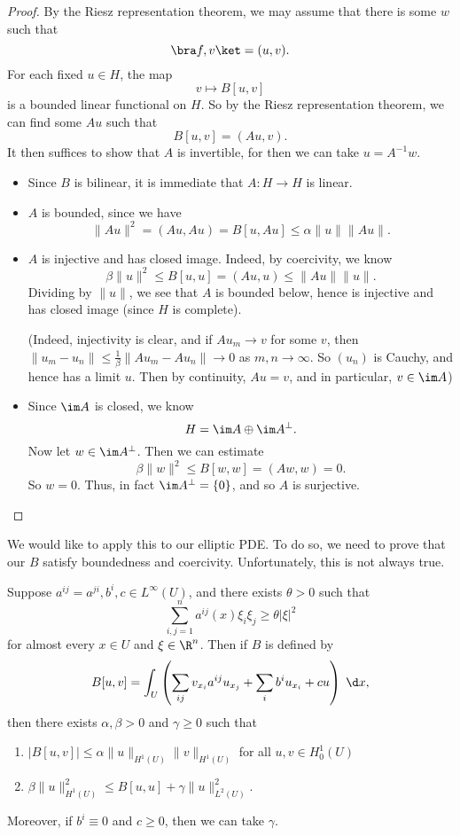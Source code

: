 \documentclass[a4paper]{article}
\begin{document}
\begin{proof}
  By the Riesz representation theorem, we may assume that there is some $w$ such that
  \[
    \bra f, v\ket = (u, v).
  \]
  For each fixed $u \in H$, the map
  \[
    v \mapsto B[u, v]
  \]
  is a bounded linear functional on $H$. So by the Riesz representation theorem, we can find some $Au$ such that
  \[
    B[u, v] = (Au, v).
  \]
  It then suffices to show that $A$ is invertible, for then we can take $u = A^{-1} w$.

  \begin{itemize}
    \item Since $B$ is bilinear, it is immediate that $A: H \to H$ is linear.
    \item $A$ is bounded, since we have
      \[
        \|Au\|^2 = (Au, Au) = B[u, Au]\leq \alpha \|u\| \|Au\|.
      \]
    \item $A$ is injective and has closed image. Indeed, by coercivity, we know
      \[
        \beta \|u\|^2 \leq B[u, u] = (Au, u) \leq \|A u\| \|u\|.
      \]
      Dividing by $\|u\|$, we see that $A$ is bounded below, hence is injective and has closed image (since $H$ is complete).

      (Indeed, injectivity is clear, and if $A u_m \to v$ for some $v$, then $\|u_m - u_n\| \leq \frac{1}{\beta} \|A u_m - A u_n\| \to 0$ as $m, n \to \infty$. So $(u_n)$ is Cauchy, and hence has a limit $u$. Then by continuity, $A u = v$, and in particular, $v \in \im A$)

    \item Since $\im A$ is closed, we know
      \[
        H = \im A \oplus \im A ^\perp.
      \]
      Now let $w \in \im A^\perp$. Then we can estimate
      \[
        \beta\|w\|^2 \leq B[w, w] = (Aw, w) = 0.
      \]
      So $w = 0$. Thus, in fact $\im A^\perp = \{0\}$, and so $A$ is surjective.\qedhere
 \end{itemize}
\end{proof}

We would like to apply this to our elliptic PDE. To do so, we need to prove that our $B$ satisfy boundedness and coercivity. Unfortunately, this is not always true.

\begin{thm}
  Suppose $a^{ij} = a^{ji}, b^i, c \in L^\infty(U)$, and there exists $\theta > 0$ such that
  \[
    \sum_{i, j = 1}^n a^{ij}(x) \xi_i \xi_j \geq \theta |\xi|^2
  \]
  for almost every $x \in U$ and $\xi \in \R^n$. Then if $B$ is defined by
  \[
    B[u, v] = \int_U \left(\sum_{ij} v_{x_i} a^{ij} u_{x_j} + \sum_i b^i u_{x_i} + c u\right)\;\d x,
  \]
  then there exists $\alpha, \beta > 0$ and $\gamma \geq 0$ such that
  \begin{enumerate}
    \item $|B[u, v]| \leq \alpha \|u\|_{H^1(U)} \|v\|_{H^1(U)}$ for all $u, v \in H_0^1(U)$
    \item $\beta\|u\|^2_{H^1(U)} \leq B[u, u] + \gamma \|u\|_{L^2(U)}^2$.
  \end{enumerate}
  Moreover, if $b^i \equiv 0$ and $c \geq 0$, then we can take $\gamma$.
\end{thm}
\end{document}
